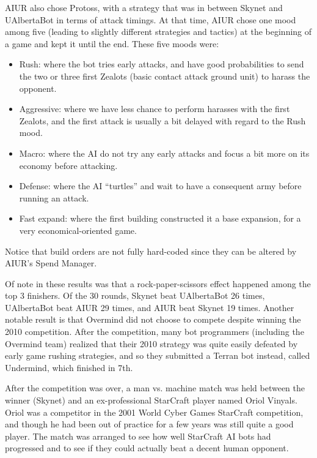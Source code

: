 \documentclass[journal]{IEEEtran}
\begin{document}
AIUR also chose  Protoss, with a strategy that was in between Skynet
and UAlbertaBot in terms of  attack timings.  At that time, AIUR chose
one  mood among  five (leading  to slightly  different  strategies and
tactics) at the  beginning of a game and kept it  until the end. These
five moods were:
\begin{itemize}
\item  Rush:  where  the  bot  tries  early  attacks,  and  have  good
  probabilities to send the two or three first Zealots (basic contact attack ground unit) to harass the
  opponent.
\item Aggressive: where  we have less chance to  perform harasses with
  the first Zealots, and the first attack is usually a bit delayed
  with regard to the Rush mood.
\item Macro: where the AI do not try any early attacks and focus a bit
  more on its economy before attacking.
\item Defense: where the AI  ``turtles'' and wait to have a consequent
  army before running an attack.
\item  Fast expand:  where the  first building  constructed it  a base
  expansion, for a very economical-oriented game.
\end{itemize}
Notice that  build orders are not  fully hard-coded since  they can be
altered by AIUR's Spend Manager.

Of  note  in  these  results  was that  a  rock-paper-scissors  effect
happened among  the top  3 finishers.  Of  the 30 rounds,  Skynet beat
UAlbertaBot 26  times, UAlbertaBot beat  AIUR 29 times, and  AIUR beat
Skynet  19 times.   Another notable  result is  that Overmind  did not
choose  to compete despite  winning the  2010 competition.   After the
competition,  many  bot  programmers  (including  the  Overmind  team)
realized that their  2010 strategy was quite easily  defeated by early
game rushing strategies,  and so they submitted a  Terran bot instead,
called Undermind, which finished in 7th.

After the competition was over, a man vs. machine match was held between the winner (Skynet) and an
ex-professional StarCraft player named Oriol Vinyals. Oriol was a competitor in the 2001 World Cyber
Games StarCraft competition, and though he had been out of practice for a few years was still quite a
good player. The match was arranged to see how well StarCraft AI bots had progressed and to see if
they could actually beat a decent human opponent. 
\end{document}
